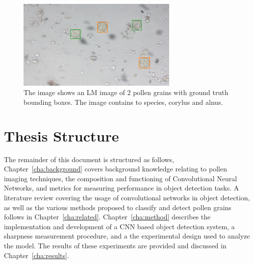 \begin{figure}[htbp]
  \centering
  \includegraphics[width=0.7\textwidth]{figs/background/GT-Snap-080.png}
  \caption[Bounding boxes]{The image shows an LM image of 2 pollen grains with ground truth bounding boxes.
The image contains to species, \textcolor{corylus}{corylus} and \textcolor{alnus}{alnus}.}\label{fig:bbox}
\end{figure}

\section{Thesis Structure}\label{sec:intro-thesis-structure}
The remainder of this document is structured as follows,
Chapter~\ref{cha:background} covers background knowledge relating to pollen imaging techniques, the composition and functioning of Convolutional Neural Networks, and metrics for measuring performance in object detection tasks.
A literature review covering the usage of convolutional networks in object detection, as well as the various methods proposed to classify and detect pollen grains follows in Chapter~\ref{cha:related}.
Chapter~\ref{cha:method} describes the implementation and development of a CNN based object detection system, a sharpness measurement procedure, and a the experimental design used to analyze the model.
The results of these experiments are provided and discussed in Chapter~\ref{cha:results}.
